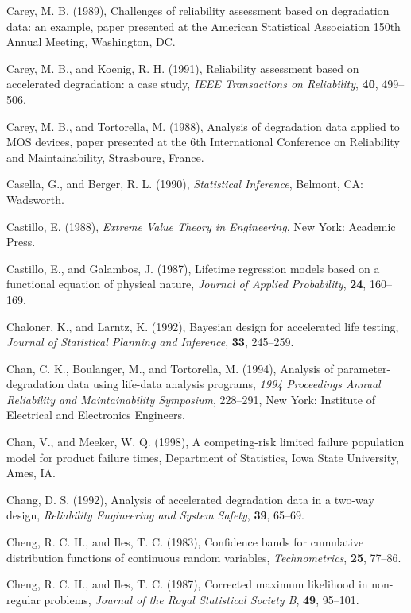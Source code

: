 \begin{thebibliography}{999}
Carey, M. B. (1989), Challenges of reliability assessment based on
degradation data: an example, paper presented at the American
Statistical Association 150th Annual Meeting, Washington, DC.

Carey, M. B., and Koenig, R. H. (1991), Reliability assessment based
on accelerated degradation: a case study,  {\em IEEE Transactions on
Reliability}, {\bf 40}, 499--506.

Carey, M. B., and Tortorella, M. (1988), Analysis of degradation
data applied to MOS devices, paper presented at the 6th
International Conference on Reliability and Maintainability,
Strasbourg, France.

Casella, G., and Berger, R. L. (1990), {\em Statistical Inference},
Belmont, CA: Wadsworth.

Castillo, E. (1988), {\em Extreme Value Theory in Engineering},
New York: Academic Press.

Castillo, E., and Galambos, J. (1987), Lifetime regression models
based on a functional equation of physical nature, {\em Journal of
Applied Probability}, {\bf 24}, 160--169.

Chaloner, K., and Larntz, K. (1992), Bayesian design for accelerated
life testing, {\em Journal of Statistical Planning and Inference},
{\bf 33}, 245--259.

Chan, C. K., Boulanger, M., and Tortorella, M. (1994), Analysis of
parameter-degradation data using life-data analysis programs, {\em
1994 Proceedings Annual Reliability and Maintainability Symposium},
228--291, New York: Institute of
Electrical and Electronics Engineers.

Chan, V., and Meeker, W. Q. (1998), A competing-risk limited failure
population model for product failure times, Department of
Statistics, Iowa State University, Ames, IA.

Chang, D. S. (1992), Analysis of accelerated degradation data in a
two-way design, {\em Reliability Engineering and System Safety},
{\bf 39}, 65--69.

Cheng, R. C. H., and Iles, T. C. (1983), Confidence bands for
cumulative distribution functions of continuous random variables,
{\em Technometrics}, {\bf 25}, 77--86.

Cheng, R. C. H., and Iles, T. C. (1987), Corrected maximum likelihood
in non-regular problems, {\em Journal of the Royal Statistical
Society B}, {\bf 49}, 95--101.


\end{thebibliography}
